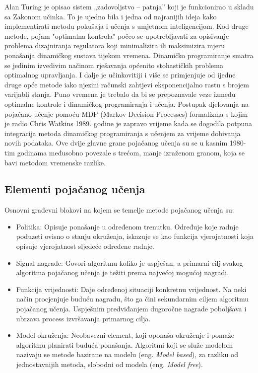 Alan Turing je opisao sistem „zadovoljstvo – patnja” koji je funkcionirao u skladu sa Zakonom učinka. To je ujedno bila i jedna od najranijih ideja kako implementirati metodu pokušaja i učenja s umjetnom inteligencijom. Kod druge metode, pojam "optimalna kontrola" počeo se upotrebljavati za opisivanje problema dizajniranja regulatora koji minimalizira ili maksimizira mjeru ponašanja dinamičkog sustava tijekom vremena. Dinamičko programiranje smatra se jedinim izvedivim načinom rješavanja općenito stohastičkih problema optimalnog upravljanja. I dalje je učinkovitiji i više se primjenjuje od ijedne druge opće metode iako njezini računski zahtjevi eksponencijalno rastu s brojem varijabli stanja. Puno vremena je trebalo da bi se prepoznavale veze između optimalne kontrole i dinamičkog programiranja i učenja. Postupak djelovanja na pojačano učenje pomoću MDP (Markov Decision Processes) formalizma s kojim je radio Chris Watkins 1989. godine je zapravo vrijeme kada se dogodila potpuna integracija metoda dinamičkog programiranja s učenjem za vrijeme dobivanja novih podataka. Ove dvije glavne grane pojačanog učenja su se u kasnim 1980-tim godinama međusobno povezale s trećom, manje izraženom granom, koja se bavi metodom vremenske razlike.

\subsection{Elementi pojačanog učenja}
Osnovni građevni blokovi na kojem se temelje metode pojačanog učenja su:
\begin{itemize}
	\item Politika: Opisuje ponašanje u određenom trenutku. Određuje koje radnje poduzeti ovisno o stanju okruženja, iskazuje se kao funkcija vjerojatnosti koja opisuje vjerojatnost sljedeće određene radnje.
	
	\item Signal nagrade: Govori algoritmu koliko je uspješan, a primarni cilj svakog algoritma pojačanog učenja je težiti prema najvećoj mogućoj nagradi. 
	
	\item Funkcija vrijednosti: Daje određenoj situaciji konkretnu vrijednost. Na neki način procjenjuje buduću nagradu, što ga čini sekundarnim ciljem algoritmu pojačanog učenja. Uspješnim predviđanjem dugoročne nagrade poboljšava i ubrzava process izvršavanja primarnog cilja. 
	
	\item Model okruženja: Neobavezni element, koji oponaša okruženje i pomaže algoritmu planirati buduća ponašanja. Algoritmi koji se služe modelom nazivaju se metode bazirane na modelu (eng. \textit{Model based}), za razliku od jednostavnijih metoda, slobodni od modela (eng. \textit{Model free}).
\end{itemize}

